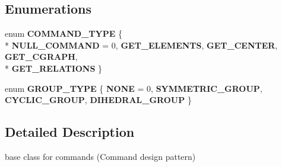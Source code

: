 \subsection*{Enumerations}
\begin{DoxyCompactItemize}
\item 
enum {\bfseries C\-O\-M\-M\-A\-N\-D\-\_\-\-T\-Y\-P\-E} \{ \\*
{\bfseries N\-U\-L\-L\-\_\-\-C\-O\-M\-M\-A\-N\-D} =  0, 
{\bfseries G\-E\-T\-\_\-\-E\-L\-E\-M\-E\-N\-T\-S}, 
{\bfseries G\-E\-T\-\_\-\-C\-E\-N\-T\-E\-R}, 
{\bfseries G\-E\-T\-\_\-\-C\-G\-R\-A\-P\-H}, 
\\*
{\bfseries G\-E\-T\-\_\-\-R\-E\-L\-A\-T\-I\-O\-N\-S}
 \}
\item 
enum {\bfseries G\-R\-O\-U\-P\-\_\-\-T\-Y\-P\-E} \{ {\bfseries N\-O\-N\-E} =  0, 
{\bfseries S\-Y\-M\-M\-E\-T\-R\-I\-C\-\_\-\-G\-R\-O\-U\-P}, 
{\bfseries C\-Y\-C\-L\-I\-C\-\_\-\-G\-R\-O\-U\-P}, 
{\bfseries D\-I\-H\-E\-D\-R\-A\-L\-\_\-\-G\-R\-O\-U\-P}
 \}
\end{DoxyCompactItemize}


\subsection{Detailed Description}
base class for commands (Command design pattern) 